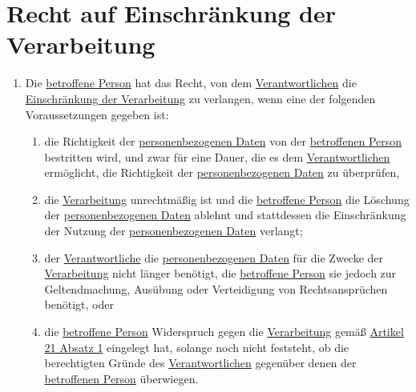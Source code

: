 \chapter{Recht auf Einschränkung der Verarbeitung}
\label{ch:18}


\begin{enumerate}

  \item Die \hyperref[itm:04-1]{betroffene Person} hat das Recht, von dem \hyperref[itm:04-7]
   {Verantwortlichen} die \hyperref[itm:04-3]{Einschränkung der Verarbeitung} zu verlangen, wenn eine der folgenden
   Voraussetzungen gegeben ist:
  \label{itm:18-1}

  \begin{enumerate}
  
    \item die Richtigkeit der \hyperref[itm:04-1]{personenbezogenen Daten} von der \hyperref[itm:04-1]
     {betroffenen Person} bestritten wird, und zwar für eine Dauer, die es dem \hyperref[itm:04-7]
     {Verantwortlichen} ermöglicht, die Richtigkeit der \hyperref[itm:04-1]{personenbezogenen Daten} zu überprüfen,
    \label{itm:18-1a}

    \item die \hyperref[itm:04-2]{Verarbeitung} unrechtmäßig ist und die \hyperref[itm:04-1]{betroffene Person} die
     Löschung der \hyperref[itm:04-1]{personenbezogenen Daten} ablehnt und stattdessen die Einschränkung der Nutzung
     der \hyperref[itm:04-1]{personenbezogenen Daten} verlangt;
    \label{itm:18-1b}

    \item der \hyperref[itm:04-7]{Verantwortliche} die \hyperref[itm:04-1]{personenbezogenen Daten} für die Zwecke
     der \hyperref[itm:04-2]{Verarbeitung} nicht länger benötigt, die
     \hyperref[itm:04-1]{betroffene Person} sie jedoch zur Geltendmachung, Ausübung oder Verteidigung von
      Rechtsansprüchen benötigt, oder
    \label{itm:18-1c}

    \item die \hyperref[itm:04-1]{betroffene Person} Widerspruch gegen die \hyperref[itm:04-2]
     {Verarbeitung} gemäß \hyperref[itm:21-1]{Artikel 21 Absatz 1} eingelegt hat, solange noch nicht feststeht, ob die
     berechtigten Gründe des \hyperref[itm:04-7]{Verantwortlichen} gegenüber denen der
     \hyperref[itm:04-1]{betroffenen Person} überwiegen.
    \label{itm:18-1d}


\end{enumerate}
\end{enumerate}

